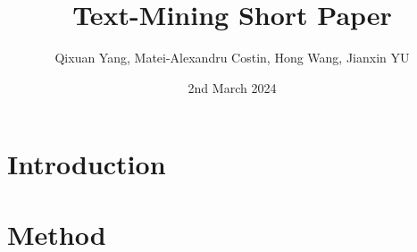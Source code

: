 \documentclass{article}
\title{Text-Mining Short Paper}
\author{Qixuan Yang, Matei-Alexandru Costin, Hong Wang, Jianxin YU}
\date{2nd March 2024}
\begin{document}
\maketitle

\section{Introduction}

\section{Method}
\end{document}
